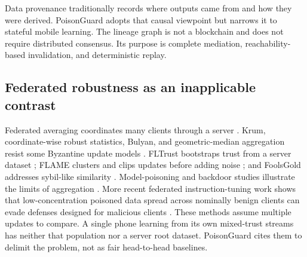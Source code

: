 Data provenance traditionally records where outputs came from and how they were derived. PoisonGuard adopts that causal viewpoint but narrows it to stateful mobile learning. The lineage graph is not a blockchain and does not require distributed consensus. Its purpose is complete mediation, reachability-based invalidation, and deterministic replay.

\subsection{Federated robustness as an inapplicable contrast}

Federated averaging coordinates many clients through a server \cite{mcmahan2017fedavg}. Krum, coordinate-wise robust statistics, Bulyan, and geometric-median aggregation resist some Byzantine update models \cite{blanchard2017krum,yin2018byzantine,mhamdi2018bulyan,pillutla2019rfa}. FLTrust bootstraps trust from a server dataset \cite{cao2020fltrust}; FLAME clusters and clips updates before adding noise \cite{nguyen2021flame}; and FoolsGold addresses sybil-like similarity \cite{fung2018sybil}. Model-poisoning and backdoor studies illustrate the limits of aggregation \cite{bhagoji2018federated,bagdasaryan2020backdoorfl}. More recent federated instruction-tuning work shows that low-concentration poisoned data spread across nominally benign clients can evade defenses designed for malicious clients \cite{zhao2026fedbit}. These methods assume multiple updates to compare. A single phone learning from its own mixed-trust streams has neither that population nor a server root dataset. PoisonGuard cites them to delimit the problem, not as fair head-to-head baselines.

\begin{table}[t]
\centering
\small
\caption{Novelty boundary across related literature.}
\label{tab:boundary}
\end{table}
